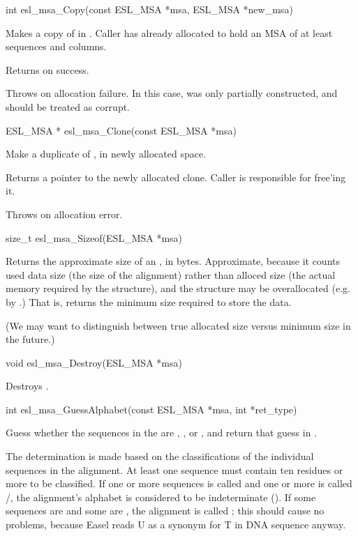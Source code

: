 \begin{sreapi}
\hypertarget{func:esl_msa_Copy()}
{\item[int esl\_msa\_Copy(const ESL\_MSA *msa, ESL\_MSA *new\_msa)]}

Makes a copy of  in . Caller has
already allocated  to hold an MSA of
at least  sequences and 
columns.

Returns  on success.

Throws  on allocation failure. In this case, 
was only partially constructed, and should be treated
as corrupt.


\hypertarget{func:esl_msa_Clone()}
{\item[ESL\_MSA * esl\_msa\_Clone(const ESL\_MSA *msa)]}

Make a duplicate of , in newly 
allocated space. 

Returns a pointer to the newly allocated clone.
Caller is responsible for free'ing it.

Throws  on allocation error.


\hypertarget{func:esl_msa_Sizeof()}
{\item[size\_t esl\_msa\_Sizeof(ESL\_MSA *msa)]}

Returns the approximate size of an , in
bytes. Approximate, because it counts used data size
(the size of the alignment) rather than alloced size
(the actual memory required by the structure),
and the structure may be overallocated (e.g.  by
.) That is, returns the minimum
size required to store the data.

(We may want to distinguish between true allocated
size versus minimum size in the future.)


\hypertarget{func:esl_msa_Destroy()}
{\item[void esl\_msa\_Destroy(ESL\_MSA *msa)]}

Destroys .



\hypertarget{func:esl_msa_GuessAlphabet()}
{\item[int esl\_msa\_GuessAlphabet(const ESL\_MSA *msa, int *ret\_type)]}

Guess whether the sequences in the  are
, , or , and return
that guess in .

The determination is made based on the classifications
of the individual sequences in the alignment. At least
one sequence must contain ten residues or more to be
classified. If one or more sequences is called
 and one or more is called /,
the alignment's alphabet is considered to be
indeterminate (). If some sequences are
 and some are , the alignment is called
; this should cause no problems, because Easel
reads U as a synonym for T in DNA sequence anyway.


\end{sreapi}
